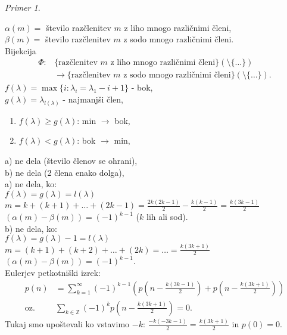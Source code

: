 \documentclass[a4paper, 12pt]{book}
\theoremstyle{definition}
\theoremstyle{remark}
\newtheorem*{ex}{Primer}
\newcommand{\Z}{\mathbb{Z}}
\begin{document}
\begin{ex}
\begin{enumerate}[label=(\arabic{*})]
      $\alpha(m) = $ število razčlenitev $m$ z liho mnogo različnimi členi, \\
      $\beta(m) = $ število razčlenitev $m$ z sodo mnogo različnimi členi. \\
      Bijekcija
      \begin{align*}
        \Phi: & \{\text{razčlenitev }m \text{ z liho mnogo različnimi členi}\} (\setminus \{\dots\}) \\
        &\to \{\text{razčlenitev }m \text{ z sodo mnogo različnimi členi}\} (\setminus \{\dots\}).
      \end{align*}
      $f(\lambda) = \max \{i: \lambda_i = \lambda_1 - i + 1\}$ - bok, \\
      $g(\lambda) = \lambda_{l(\lambda)}$ - najmanjši člen,
      \begin{enumerate}[label={\alph*)}]
        \item $f(\lambda) \geq g(\lambda)$: min $\to$ bok,
        \item $f(\lambda) < g(\lambda)$: bok $\to$ min,
      \end{enumerate}
      a) ne dela (število členov se ohrani), \\ %
      b) ne dela (2 člena enako dolga), \\ %
      a) ne dela, ko: \\ %
      $f(\lambda) = g(\lambda) = l(\lambda)$ \\
      $m = k + (k+1) + \dots + (2k-1) = \frac{2k(2k-1)}{2} - \frac{k(k-1)}{2} = \frac{k(3k-1)}{2}$ \\
      $(\alpha(m) - \beta(m)) = (-1)^{k-1}$ ($k$ lih ali sod). \\
      b) ne dela, ko: \\ %
      $f(\lambda) = g(\lambda) - 1 = l(\lambda)$ \\
      $m = (k+1) + (k+2) + \dots + (2k) = \dots = \frac{k(3k+1)}{2}$ \\
      $(\alpha(m) - \beta(m)) = (-1)^{k-1}$. \\
      Eulerjev petkotniški izrek:
      \begin{align*}
        p(n) &= \sum_{k=1}^{\infty} (-1)^{k-1} \left(p\left(n-\frac{k(3k-1)}{2}\right) + p\left(n-\frac{k(3k+1)}{2}\right)\right) \\
        \text{oz.} & \sum_{k \in \Z} (-1)^k p\left(n - \frac{k(3k+1)}{2}\right) = 0.
      \end{align*}
      Tukaj smo upoštevali ko vstavimo $-k$: $\frac{-k(-3k-1)}{2} = \frac{k(3k+1)}{2}$ in $p(0) = 0$.
  \end{enumerate}
\end{ex}
\end{document}
